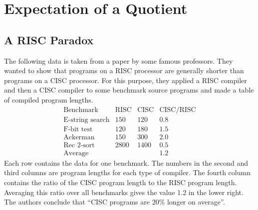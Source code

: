 \documentclass[11pt,twoside]{article}
\begin{document}
\bigskip

\fi

\section{Expectation of a Quotient}

\subsection{A RISC Paradox}

The following data is taken from a paper by some famous professors.  They
wanted to show that programs on a RISC processor are generally shorter
than programs on a CISC processor.  For this purpose, they applied a RISC
compiler and then a CISC compiler to some benchmark source programs and
made a table of compiled program lengths.
\[
\begin{array}{lccc}
\text{Benchmark}        & \text{RISC}   & \text{CISC}   & \text{CISC/RISC}\\
\hline
\text{E-string search}  & 150           & 120           & 0.8 \\
\text{F-bit test}       & 120           & 180           & 1.5 \\
\text{Ackerman}         & 150           & 300           & 2.0 \\
\text{Rec 2-sort}       & 2800          & 1400          & 0.5 \\
\hline
\text{Average}          &               &               & 1.2
\end{array}
\]
Each row contains the data for one benchmark.  The numbers in the second
and third columns are program lengths for each type of compiler.  The
fourth column contains the ratio of the CISC program length to the RISC
program length.  Averaging this ratio over all benchmarks gives the value
1.2 in the lower right.  The authors conclude that ``CISC programs are
20\% longer on average''.
\end{document}
